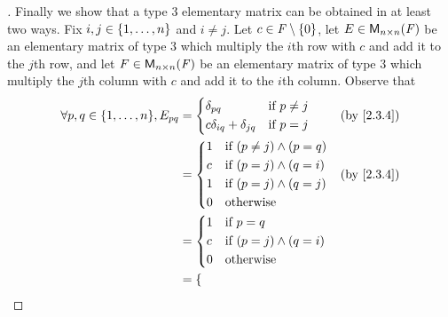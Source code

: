 \begin{proof}[]
  Finally we show that a type 3 elementary matrix can be obtained in at least two ways.
  Fix \(i, j \in \left\lbrace1, \dots, n\right\rbrace\) and \(i \neq j\).
  Let \(c \in \mathit{F} \setminus \left\lbrace0\right\rbrace\), let \(E \in \ms[n][n][\F]\) be an elementary matrix of type 3 which multiply the \(i\)th row with \(c\) and add it to the \(j\)th row, and let \(F \in \ms[n][n][\F]\) be an elementary matrix of type 3 which multiply the \(j\)th column with \(c\) and add it to the \(i\)th column.
  Observe that
  \begin{align*}
    \forall p, q \in \set{1, \dots, n}, E_{p q} & = \begin{dcases}
                                                      \delta_{p q}                  & \text{if } p \neq j \\
                                                      c \delta_{i q} + \delta_{j q} & \text{if } p = j
                                                    \end{dcases} &  & \by{2.3.4}                  \\
                                                & = \begin{dcases}
                                                      1 & \text{if } (p \neq j) \land (p = q) \\
                                                      c & \text{if } (p = j) \land (q = i)    \\
                                                      1 & \text{if } (p = j) \land (q = j)    \\
                                                      0 & \text{otherwise}
                                                    \end{dcases}             &  & \by{2.3.4}                             \\
                                                & = \begin{dcases}
                                                      1 & \text{if } p = q                 \\
                                                      c & \text{if } (p = j) \land (q = i) \\
                                                      0 & \text{otherwise}
                                                    \end{dcases}                                 \\
                                                & = \begin{dcases}

\end{dcases}
\end{align*}
\end{proof}
